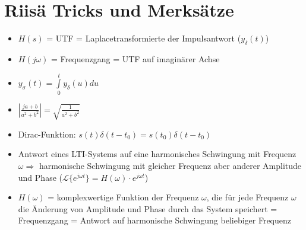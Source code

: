 \section{Riisä Tricks und Merksätze}
\begin{itemize}
  \item $H(s)$ = UTF = Laplacetransformierte der Impulsantwort ($y_\delta(t)$)
  \item $H(j \omega)$ = Frequenzgang = UTF auf imaginärer Achse
  \item $y_\sigma(t) = \int\limits_0^t y_\delta(u)du$
  \item $\left| \frac{ja + b}{a^2 + b^2} \right| = \sqrt{\frac{1}{a^2 + b^2}}$
  \item Dirac-Funktion: $s(t)\delta(t-t_0) = s(t_0)\delta(t-t_0)$
  \item Antwort eines LTI-Systems auf eine harmonisches Schwingung mit Frequenz $\omega \Rightarrow$ harmonische
  Schwingung mit gleicher Frequenz aber anderer Amplitude und Phase ($\mathcal{L}\{e^{j \omega t}\} = H(\omega) \cdot
  e^{j \omega t}$)
  \item $H(\omega)$ = komplexwertige Funktion der Frequenz $\omega$, die für jede Frequenz $\omega$ die
  Änderung von Amplitude und Phase durch das System speichert = Frequenzgang = Antwort auf harmonische Schwingung
  beliebiger Frequenz
\end{itemize}
